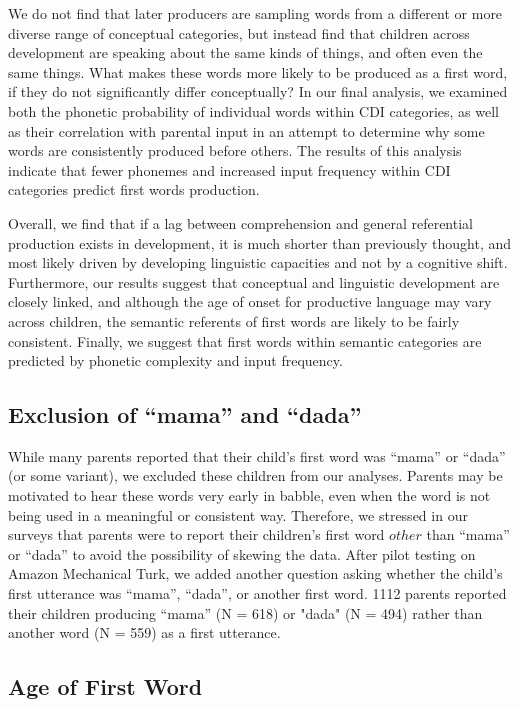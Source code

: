 \documentclass[10pt,letterpaper]{article}
\begin{document}
We do not find that later producers are sampling words from a different or more diverse range of conceptual categories, but instead find that children across development are speaking about the same kinds of things, and often even the same things. What makes these words more likely to be produced as a first word, if they do not significantly differ conceptually? In our final analysis, we examined both the phonetic probability of individual words within CDI categories, as well as their correlation with parental input in an attempt to determine why some words are consistently produced before others. The results of this analysis indicate that fewer phonemes and increased input frequency within CDI categories predict first words production.

Overall, we find that if a lag between comprehension and general referential production exists in development, it is much shorter than previously thought, and most likely driven by developing linguistic capacities and not by a cognitive shift. Furthermore, our results suggest that conceptual and linguistic development are closely linked, and although the age of onset for productive language may vary across children, the semantic referents of first words are likely to be fairly consistent. Finally, we suggest that first words within semantic categories are predicted by phonetic complexity and input frequency. 

\subsection{Exclusion of ``mama'' and ``dada''}
While many parents reported that their child's first word was ``mama'' or ``dada'' (or some variant), we excluded these children from our analyses. Parents may be motivated to hear these words very early in babble, even when the word is not being used in a meaningful or consistent way. Therefore, we stressed in our surveys that parents were to report their children's first word $other$ than ``mama'' or ``dada'' to avoid the possibility of skewing the data. After pilot testing on Amazon Mechanical Turk, we added another question asking whether the child's first utterance was ``mama'', ``dada'', or another first word. 1112 parents reported their children producing ``mama'' (N = 618) or "dada" (N = 494) rather than another word (N = 559) as a first utterance. 

\subsection{Age of First Word} 
\end{document}
